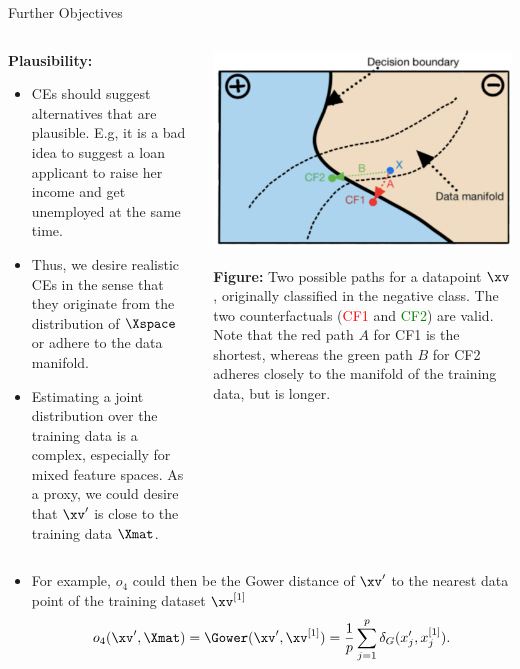 \documentclass[11pt,compress,t,notes=noshow, xcolor=table]{beamer}
\begin{document}
\begin{vbframe}{Further Objectives}
	\begin{columns}
	\begin{column}{0.55\textwidth}
		\textbf{Plausibility:}
		\begin{itemize}
			\item CEs should suggest alternatives that are plausible. E.g, it is a bad idea to suggest a loan applicant to raise her income and get unemployed at the same time. 
			\item Thus, we desire realistic CEs in the sense that they originate from the distribution of $\Xspace$ or adhere to the data manifold. 
			\item Estimating a joint distribution over the training data is a complex, especially for mixed feature spaces. As a proxy, we could desire that $\xv'$ is close to the training data $\Xmat$. 
		\end{itemize}	
	\end{column}
	\begin{column}{0.4\textwidth}
			\begin{center}
			\includegraphics[width=1\textwidth]{figure/counterfactuals_obj}
		\end{center}
		
		\scriptsize{\textbf{Figure:} Two possible paths for a datapoint \textcolor{blue}{$\xv$},
			originally classified in the negative class. The two counterfactuals (\textcolor{red}{CF1} and \textcolor{green}{CF2}) are valid. Note that the red path $A$ for CF1 is the shortest, whereas the
			green path $B$ for CF2 adheres closely to the manifold of the training data, but is longer.}
		\vspace{0.3cm}
	\end{column}
	\end{columns}
	\begin{itemize}
		\item For example, $o_4$ could then be the Gower distance of $\xv'$ to the nearest data point of the training dataset $\xv^{[1]}$
	$$o_4(\xv', \Xmat) = \Gower(\xv', \xv^{[1]}) = \frac{1}{p} \sum_{j = 1}^{p}  \delta_G(x_j', x^{[1]}_j).$$
		\end{itemize}
	

\end{vbframe}
\end{document}
